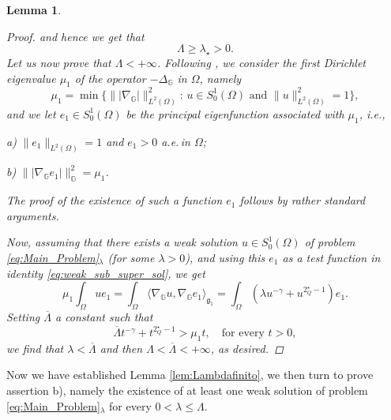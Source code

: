 \documentclass[11pt]{amsart}
\numberwithin{equation}{section} %
\newtheorem{lemma}[teo]{Lemma}
\theoremstyle{definition}
\begin{document}
\begin{lemma}
\begin{proof}
		and hence we get that 
		$$\Lambda \geq \lambda_{\star}>0.$$
		\indent Let us now prove that $\Lambda < +\infty$. Following \cite{Haitao}, we consider 
		the \emph{first 
			Dirichlet eigenvalue $\mu_1$ of the operator $-\Delta_{\mathbb{G}}$} in $\Omega$, namely 
		$$\mu_1 = \min\big\{\||\nabla_{\mathbb{G}}|\|_{L^{2}(\Omega)}^2:\,\text{$u\in S^{1}_{0}(\Omega)$ and $\|u\|^2_{L^2(\Omega)} = 1$}\big\},$$
		and we let $e_1\in S^{1}_{0}(\Omega)$ 
		be the principal eigenfunction associated with $\mu_1$, i.e.,
		\vspace*{0.1cm}
		
		a)\,\,$\|e_1\|_{L^2(\Omega)} = 1$ and $e_1 > 0$ a.e.\,in $\Omega$; 
		\vspace*{0.05cm}
		
		b)\,\,$\||\nabla_{\mathbb{G}}e_1|\|_{\mathbb{G}}^2 = \mu_1$.
		\vspace*{0.1cm}
		
		\noindent The proof of the existence of such a function $e_1$ follows by rather standard arguments.
		
		Now, assuming that there exists
		a weak solution $u\in S^{1}_{0}(\Omega)$ of problem
		\eqref{eq:Main_Problem}$_\lambda$ (for some $\lambda > 0$),
		and using this $e_1$ as a test function in identity \eqref{eq:weak_sub_super_sol}, we get
		\begin{equation*}
			\mu_1 \int_{\Omega}ue_1  = \int_{\Omega}\langle \nabla_{\mathbb{G}}u, \nabla_{\mathbb{G}}e_1\rangle_{\mathfrak{g}_{1}} = \int_{\Omega}(\lambda u^{-\gamma} + u^{2^{\star}_{Q}-1})e_1.
		\end{equation*}
		Setting $\overline{\Lambda}$ a constant such that
		$$\overline{\Lambda}  t^{-\gamma} + t^{2^{\star}_{Q}-1} >  \mu_1 t, \quad \textrm{for every } t>0,$$
		\noindent we find that $\lambda < \overline{\Lambda}$ and then $\Lambda < \overline{\Lambda}<+\infty$, as desired.
	\end{proof}
\end{lemma}


Now we have established Lemma \ref{lem:Lambdafinito}, we then turn to 
prove assertion b), namely
the existence of at least one weak solution of problem \eqref{eq:Main_Problem}$_\lambda$ for
every $0<\lambda\leq \Lambda$. 
\medskip
\end{document}
